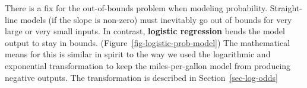 \documentclass[
  letterpaper,
  DIV=11,
  numbers=noendperiod,
  oneside]{scrartcl}
\begin{document}
{
\makeatletter
\def\LT@makecaption#1#2#3{%
  \noalign{\smash{\hbox{\kern\textwidth\rlap{\kern\marginparsep
  \parbox[t]{\marginparwidth}{%
    \footnotesize{%
      \vspace{(1.1\baselineskip)}
    #1{#2: }\ignorespaces #3}}}}}}%
    }
\makeatother

\begin{figure}



\end{figure}%

}

There is a fix for the out-of-bounds problem when modeling probability.
Straight-line models (if the slope is non-zero) must inevitably go out
of bounds for very large or very small inputs. In contrast,
\textbf{logistic regression} bends the model output to stay in bounds.
(Figure~\ref{fig-logistic-prob-model}) The mathematical means for this
is similar in spirit to the way we used the logarithmic and exponential
transformation to keep the miles-per-gallon model from producing
negative outputs. The transformation is described in
Section~\ref{sec-log-odds}
\end{document}
